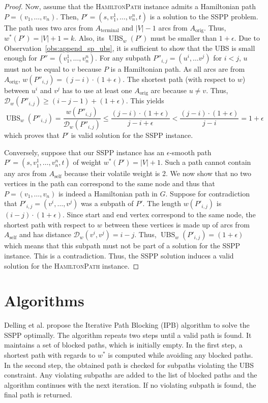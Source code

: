 \documentclass[a4paper,UKenglish,cleveref, autoref, thm-restate]{lipics-v2021}
\newcommand*{\dist}{\mathcal{D}}
\newcommand*{\ubs}{\operatorname{UBS}}
\begin{document}
\begin{proof}
Now, assume that the \textsc{HamiltonPath} instance admits a Hamiltonian path $P = (v_1, \dots, v_n)$.
Then, $P' = (s, v_1^1, \dots, v_n^n, t)$ is a solution to the SSPP problem.
The path uses two arcs from $A_{\operatorname{terminal}}$ and $|V|-1$ arcs from $A_{\operatorname{orig}}$.
Thus, $w^{*}(P') = |V| + 1 = k$.
Also, its $\ubs_w(P')$ must be smaller than $1+\epsilon$.
Due to Observation~\ref{obs:append_sp_ubs}, it is sufficient to show that the UBS is small enough for $P'' = (v_1^1, \dots, v_n^n)$.
For any subpath $P''_{i,j} = (u^i, \dots v^j)$ for $i < j$, $u$ must not be equal to $v$ because $P$ is a Hamiltonian path.
As all arcs are from $A_{\operatorname{orig}}$, $w(P''_{i,j}) = (j-i) \cdot (1+\epsilon)$.
The shortest path (with respect to $w$) between $u^i$ and $v^j$ has to use at least one $A_{\operatorname{orig}}$ arc because $u \neq v$.
Thus, $\dist_w(P''_{i,j}) \geq (i - j - 1) + (1 + \epsilon)$.
This yields
\[
\ubs_w(P''_{i,j}) = \frac{w(P''_{i,j})}{\dist_w(P''_{i,j})} \leq \frac{(j-i) \cdot (1+\epsilon)}{j-i+\epsilon} < \frac{(j-i) \cdot (1+\epsilon)}{j-i} = 1 + \epsilon
\]
which proves that $P'$ is valid solution for the SSPP instance.

Conversely, suppose that our SSPP instance has an $\epsilon$-smooth path $P' = (s, v_1^1, \dots, v_n^n, t)$ of weight $w^*(P') = |V|+1$.
Such a path cannot contain any arcs from $A_{\operatorname{self}}$ because their volatile weight is 2.
We now show that no two vertices in the path can correspond to the same node and thus that $P = (v_1, \dots, v_n)$ is indeed a Hamiltonian path in $G$.
Suppose for contradiction that $P'_{i,j} = (v^i, \dots, v^j)$ was a subpath of $P'$.
The length $w(P'_{i,j})$ is $(i-j) \cdot (1+\epsilon)$.
Since start and end vertex correspond to the same node, the shortest path with respect to $w$ between these vertices is made up of arcs from $A_{\operatorname{self}}$ and has distance $\dist_w(v^i, v^j) = i-j$.
Thus, $\ubs_w(P'_{i,j}) = (1+\epsilon)$ which means that this subpath must not be part of a solution for the SSPP instance.
This is a contradiction.
Thus, the SSPP solution induces a valid solution for the \textsc{HamiltonPath} instance.
\end{proof}

\section{Algorithms}\label{sec:algos}

Delling et al. propose the Iterative Path Blocking (IPB) algorithm to solve the SSPP optimally.
The algorithm repeats two steps until a valid path is found.
It maintains a set of blocked paths, which is initially empty.
In the first step, a shortest path with regards to $w^*$ is computed while avoiding any blocked paths.
In the second step, the obtained path is checked for subpaths violating the UBS constraint.
Any violating subpaths are added to the list of blocked paths and the algorithm continues with the next iteration.
If no violating subpath is found, the final path is returned.
\end{document}
